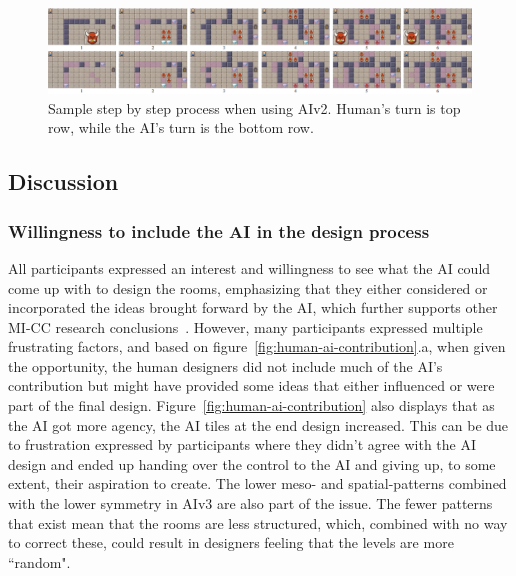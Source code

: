 


\begin{figure}[h!]
 \includegraphics[width=\textwidth]{images/rooms-designed-2.png}
 \caption{Sample step by step process when using AIv2. Human's turn is top row, while the AI's turn is the bottom row.}
 \label{fig:exampleDesignProcess}
\end{figure}

\subsection{Discussion}
\label{sec:discussion}


\subsubsection{Willingness to include the AI in the design process}

All participants expressed an interest and willingness to see what the AI could come up with to design the rooms, emphasizing that they either considered or incorporated the ideas brought forward by the AI, which further supports other MI-CC research conclusions~\cite{p13guzdial_friend_2019,bhaumik_lode_2021}. However, many participants expressed multiple frustrating factors, and based on figure~\ref{fig:human-ai-contribution}.a, when given the opportunity, the human designers did not include much of the AI's contribution but might have provided some ideas that either influenced or were part of the final design. Figure~\ref{fig:human-ai-contribution} also displays that as the AI got more agency, the AI tiles at the end design increased. This can be due to frustration expressed by participants where they didn't agree with the AI design and ended up handing over the control to the AI and giving up, to some extent, their aspiration to create. The lower meso- and spatial-patterns combined with the lower symmetry in AIv3 are also part of the issue. The fewer patterns that exist mean that the rooms are less structured, which, combined with no way to correct these, could result in designers feeling that the levels are more ``random".


